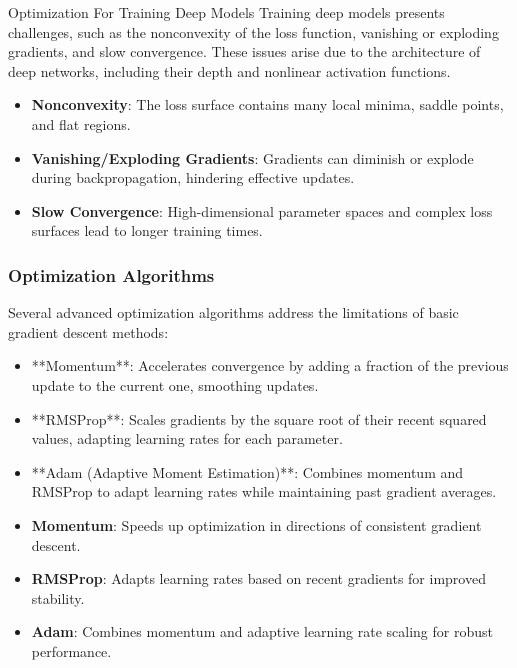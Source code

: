 \begin{notes}{Optimization For Training Deep Models}
    Training deep models presents challenges, such as the nonconvexity of the loss function, vanishing or exploding gradients, and slow convergence. These issues arise due to the architecture of deep networks, 
    including their depth and nonlinear activation functions.
    
    \begin{highlight}
        \begin{itemize}
            \item \textbf{Nonconvexity}: The loss surface contains many local minima, saddle points, and flat regions.
            \item \textbf{Vanishing/Exploding Gradients}: Gradients can diminish or explode during backpropagation, hindering effective updates.
            \item \textbf{Slow Convergence}: High-dimensional parameter spaces and complex loss surfaces lead to longer training times.
        \end{itemize}
    \end{highlight}
    
    \subsubsection*{Optimization Algorithms}
    
    Several advanced optimization algorithms address the limitations of basic gradient descent methods:
    
    \begin{itemize}
        \item **Momentum**: Accelerates convergence by adding a fraction of the previous update to the current one, smoothing updates.
        \item **RMSProp**: Scales gradients by the square root of their recent squared values, adapting learning rates for each parameter.
        \item **Adam (Adaptive Moment Estimation)**: Combines momentum and RMSProp to adapt learning rates while maintaining past gradient averages.
    \end{itemize}
    
    \begin{highlight}
        \begin{itemize}
            \item \textbf{Momentum}: Speeds up optimization in directions of consistent gradient descent.
            \item \textbf{RMSProp}: Adapts learning rates based on recent gradients for improved stability.
            \item \textbf{Adam}: Combines momentum and adaptive learning rate scaling for robust performance.
        \end{itemize}
    \end{highlight}
    

\end{notes}
